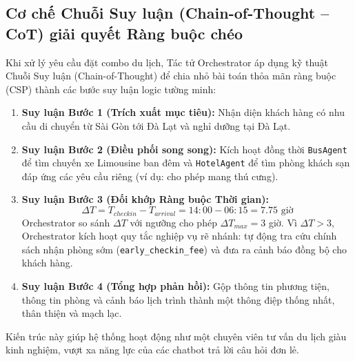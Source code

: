 \subsection{Cơ chế Chuỗi Suy luận (Chain-of-Thought -- CoT) giải quyết Ràng buộc chéo}
Khi xử lý yêu cầu đặt combo du lịch, Tác tử Orchestrator áp dụng kỹ thuật Chuỗi Suy luận (Chain-of-Thought) để chia nhỏ bài toán thỏa mãn ràng buộc (CSP) thành các bước suy luận logic tường minh:
\begin{enumerate}
    \item \textbf{Suy luận Bước 1 (Trích xuất mục tiêu):} Nhận diện khách hàng có nhu cầu di chuyển từ Sài Gòn tới Đà Lạt và nghỉ dưỡng tại Đà Lạt.
    \item \textbf{Suy luận Bước 2 (Điều phối song song):} Kích hoạt đồng thời \texttt{BusAgent} để tìm chuyến xe Limousine ban đêm và \texttt{HotelAgent} để tìm phòng khách sạn đáp ứng các yêu cầu riêng (ví dụ: cho phép mang thú cưng).
    \item \textbf{Suy luận Bước 3 (Đối khớp Ràng buộc Thời gian):} 
    \begin{equation}
        \Delta T = T_{checkin} - T_{arrival} = 14:00 - 06:15 = 7.75 \text{ giờ}
    \end{equation}
    Orchestrator so sánh $\Delta T$ với ngưỡng cho phép $\Delta T_{max} = 3$ giờ. Vì $\Delta T > 3$, Orchestrator kích hoạt quy tắc nghiệp vụ rẽ nhánh: tự động tra cứu chính sách nhận phòng sớm (\texttt{early\_checkin\_fee}) và đưa ra cảnh báo đồng bộ cho khách hàng.
    \item \textbf{Suy luận Bước 4 (Tổng hợp phản hồi):} Gộp thông tin phương tiện, thông tin phòng và cảnh báo lịch trình thành một thông điệp thống nhất, thân thiện và mạch lạc.
\end{enumerate}
Kiến trúc này giúp hệ thống hoạt động như một chuyên viên tư vấn du lịch giàu kinh nghiệm, vượt xa năng lực của các chatbot trả lời câu hỏi đơn lẻ.
